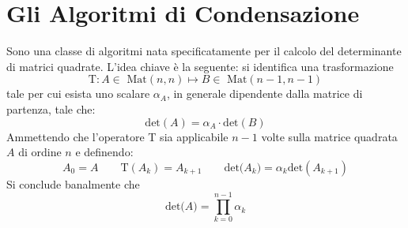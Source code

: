 \documentclass{article}
\begin{document}
\section{Gli Algoritmi di Condensazione}
Sono una classe di algoritmi nata specificatamente per il calcolo del determinante di matrici quadrate.
L'idea chiave è la seguente: si identifica una trasformazione $$\mbox{T}: A \in \mbox{ Mat}(n,n) \longmapsto B \in \mbox{ Mat}(n-1,n-1)$$
tale per cui esista uno scalare $\alpha_{A}$, in generale dipendente dalla matrice di partenza, tale che:
\begin{displaymath}
\mbox{det}(A) = \alpha_{A} \cdot \mbox{det}(B)
\end{displaymath}
Ammettendo che l'operatore T sia applicabile $n-1$ volte sulla matrice quadrata $A$ di ordine $n$  e definendo:
\begin{displaymath}
	A_{0} = A \qquad \mbox{T}(A_{k})= A_{k+1} \qquad \mbox{det}\big(A_{k}\big) =  \alpha_{k}\mbox{det}(A_{k+1} )
\end{displaymath}
Si conclude banalmente che 
\begin{equation}
	\mbox{det}\big(A\big) = \prod_{k=0}^{n-1} \alpha_{k}
\end{equation}
\end{document}
